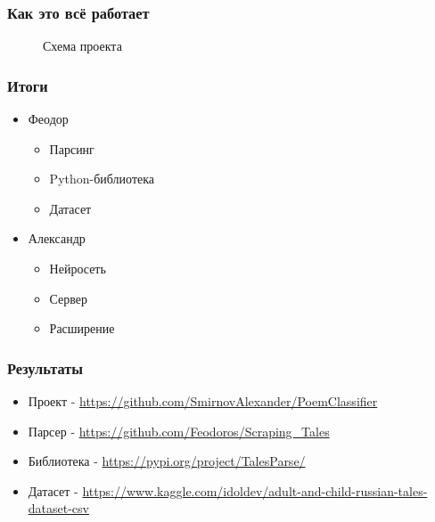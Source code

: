 \documentclass[xetex,mathserif,serif]{beamer}
\begin{document}
	\begin{frame}
		\frametitle{Как это всё работает}
		\begin{figure}[h]
            \caption{Схема проекта}
            \label{fig:image}
        \end{figure}
	\end{frame}	
	
	\begin{frame}
		\frametitle{Итоги}
		\begin{itemize}
			\item Феодор
			    \begin{itemize}
			    	\item Парсинг
			    	\item Python-библиотека
			    	\item Датасет
		        \end{itemize}
			\item Александр
			    \begin{itemize}
			    	\item Нейросеть
			    	\item Сервер
			    	\item Расширение
		        \end{itemize}
		\end{itemize}
	\end{frame}
	
	\begin{frame}
		\frametitle{Результаты}
		\begin{itemize}
			\item Проект - \url{https://github.com/SmirnovAlexander/PoemClassifier}
			\item Парсер - \url{https://github.com/Feodoros/Scraping_Tales}
			\item Библиотека - \url{https://pypi.org/project/TalesParse/}
			\item Датасет - \url{https://www.kaggle.com/idoldev/adult-and-child-russian-tales-dataset-csv}
		\end{itemize}
	\end{frame}
\end{document}
